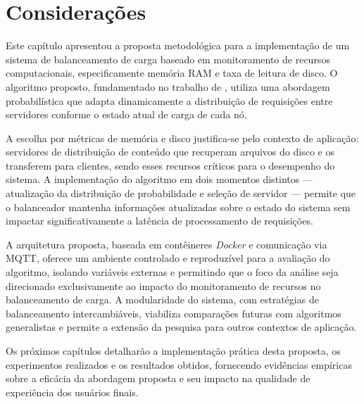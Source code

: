 \section{Considerações}

Este capítulo apresentou a proposta metodológica para a implementação de um sistema de balanceamento de carga baseado em monitoramento de recursos computacionais, especificamente memória RAM e taxa de leitura de disco. O algoritmo proposto, fundamentado no trabalho de \cite{interpretingStaleLoadInformation2000}, utiliza uma abordagem probabilística que adapta dinamicamente a distribuição de requisições entre servidores conforme o estado atual de carga de cada nó.

A escolha por métricas de memória e disco justifica-se pelo contexto de aplicação: servidores de distribuição de conteúdo que recuperam arquivos do disco e os transferem para clientes, sendo esses recursos críticos para o desempenho do sistema. A implementação do algoritmo em dois momentos distintos --- atualização da distribuição de probabilidade e seleção de servidor --- permite que o balanceador mantenha informações atualizadas sobre o estado do sistema sem impactar significativamente a latência de processamento de requisições.

A arquitetura proposta, baseada em contêineres \textit{Docker} e comunicação via MQTT, oferece um ambiente controlado e reproduzível para a avaliação do algoritmo, isolando variáveis externas e permitindo que o foco da análise seja direcionado exclusivamente ao impacto do monitoramento de recursos no balanceamento de carga. A modularidade do sistema, com estratégias de balanceamento intercambiáveis, viabiliza comparações futuras com algoritmos generalistas e permite a extensão da pesquisa para outros contextos de aplicação.

Os próximos capítulos detalharão a implementação prática desta proposta, os experimentos realizados e os resultados obtidos, fornecendo evidências empíricas sobre a eficácia da abordagem proposta e seu impacto na qualidade de experiência dos usuários finais.
